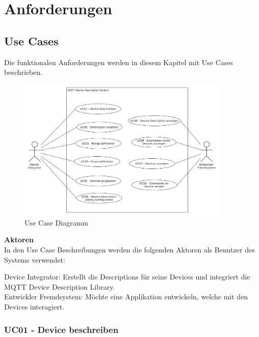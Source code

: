\chapter{Anforderungen}
\label{chap:requirements}

\section{Use Cases}
Die funktionalen Anforderungen werden in diesem Kapitel mit Use Cases beschrieben.

\begin{figure}[H]
	\centering
		\includegraphics[width=0.9\textwidth]{diag/use_cases.png}
	\caption{Use Case Diagramm}
\end{figure}
\textbf{Aktoren} \\
In den Use Case Beschreibungen werden die folgenden Aktoren als Benutzer des Systems verwendet:

Device Integrator: Erstellt die Descriptions für seine Devices und integriert die MQTT Device Description Library. \\
Entwickler Fremdsystem: Möchte eine Applikation entwickeln, welche mit den Devices interagiert. \\

\subsection{UC01 - Device beschreiben}

